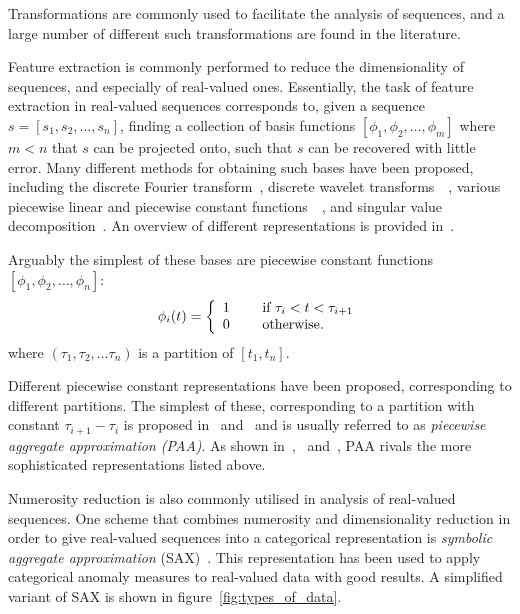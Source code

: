 Transformations are commonly used to facilitate the analysis of sequences, and a large number of different such transformations are found in the literature.

Feature extraction is commonly performed to reduce the dimensionality of sequences, and especially of real-valued ones. Essentially, the task of feature extraction in real-valued sequences corresponds to, given a sequence $s = [s_1, s_2, \dots, s_n]$, finding a collection of basis functions $[\phi_1, \phi_2, \dots, \phi_m]$ where $m < n$ that $s$ can be projected onto, such that $s$ can be recovered with little error. Many different methods for obtaining such bases have been proposed, including the discrete Fourier transform~\cite{faloutsos1}, discrete wavelet transforms~\cite{pong}~\cite{fu}, various piecewise linear and piecewise constant functions~\cite{keogh3}~\cite{geurts}, and singular value decomposition~\cite{keogh3}. An overview of different representations is provided in~\cite{fabian}.

Arguably the simplest of these bases are piecewise constant functions $[\phi_1, \phi_2, \dots, \phi_n]$:
\[
  \phi_i(t) = \left\{
    \begin{array}{l l}
      1 & \quad \text{ if } \tau_i < t < \tau_{i+1} \\
      0 & \quad \text{ otherwise.} \\
    \end{array} \right.
\]
where $(\tau_1, \tau_2, \dots \tau_n)$ is a partition of $[t_1, t_n]$.

Different piecewise constant representations have been proposed, corresponding to different partitions. The simplest of these, corresponding to a partition with constant $\tau_{i+1} - \tau_i$ is proposed in~\cite{keogh4} and~\cite{faloutsos2} and is usually referred to as \emph{piecewise aggregate approximation (PAA)}. As shown in~\cite{keogh5},~\cite{keogh3} and~\cite{faloutsos2}, PAA rivals the more sophisticated representations listed above.

Numerosity reduction is also commonly utilised in analysis of real-valued sequences. One scheme that combines numerosity and dimensionality reduction in order to give real-valued sequences into a categorical representation is \emph{symbolic aggregate approximation} (SAX)~\cite{sax}. This representation has been used to apply categorical anomaly measures to real-valued data with good results. A simplified variant of SAX is shown in figure~\ref{fig:types_of_data}.

